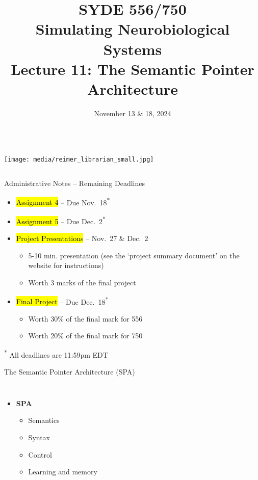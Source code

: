 \documentclass[handout,aspectratio=169]{beamer}
\date{November 13 \& 18, 2024}
\title{SYDE 556/750 \\ Simulating Neurobiological Systems \\ Lecture 11: The Semantic Pointer Architecture}
\begin{document}
	
	\begin{frame}{}
		\vspace{0.5cm}
		\begin{columns}[c]
			\MakeTitle
			\texttt{[image: media/reimer\_librarian\_small.jpg]}
		\end{columns}
	\end{frame}

	\begin{frame}{Administrative Notes -- Remaining Deadlines}
		\begin{itemize}
			\setlength{\itemsep}{0.5cm}
			\item \hl{Assignment 4} -- Due Nov.~18\textsuperscript{*}
			\item \hl{Assignment 5} -- Due Dec.~2\textsuperscript{*}
			\item \hl{Project Presentations} --  Nov.~27 \& Dec.~2\\[0.125cm]
			\begin{itemize}
				\setlength{\itemsep}{0.125cm}
				\item 5-10 min. presentation (see the `project summary document' on the website for instructions)
				\item Worth 3 marks of the final project
			\end{itemize}
			\item \hl{Final Project} -- Due Dec.~18\textsuperscript{*}\\[0.125cm]
			\begin{itemize}
				\item Worth 30\% of the final mark for 556
				\item Worth 20\% of the final mark for 750
			\end{itemize}
		\end{itemize}
		\vspace{0.5cm}
		{\footnotesize\color{aluminium4}\textsuperscript{*} All deadlines are 11:59pm EDT}
	\end{frame}

	\begin{frame}{The Semantic Pointer Architecture (SPA)}
    \begin{columns}
      \centering
			\begin{itemize}
        \item \textbf{SPA}\\[.5cm]
				\begin{itemize}			
					\setlength{\itemsep}{0.5cm}
					\item Semantics
					\item Syntax
					\item Control
					\item Learning and memory
				\end{itemize}
			\end{itemize}
      \centering
    \end{columns}
	\end{frame}
\end{document}
